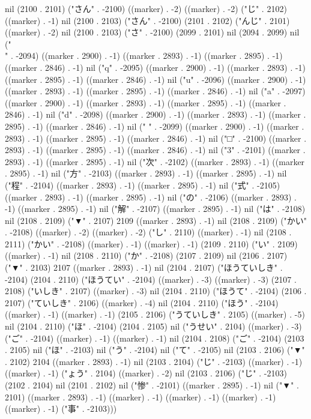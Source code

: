 nil (2100 . 2101) ("さん" . -2100) ((marker) . -2) ((marker) . -2) ("じ" . 2102) ((marker) . -1) nil (2100 . 2103) ("さん" . -2100) (2101 . 2102) ("んじ" . 2101) ((marker) . -2) nil (2100 . 2103) ("さ" . -2100) (2099 . 2101) nil (2094 . 2099) nil ("\\" . -2094) ((marker . 2900) . -1) ((marker . 2893) . -1) ((marker . 2895) . -1) ((marker . 2846) . -1) nil ("q" . -2095) ((marker . 2900) . -1) ((marker . 2893) . -1) ((marker . 2895) . -1) ((marker . 2846) . -1) nil ("u" . -2096) ((marker . 2900) . -1) ((marker . 2893) . -1) ((marker . 2895) . -1) ((marker . 2846) . -1) nil ("a" . -2097) ((marker . 2900) . -1) ((marker . 2893) . -1) ((marker . 2895) . -1) ((marker . 2846) . -1) nil ("d" . -2098) ((marker . 2900) . -1) ((marker . 2893) . -1) ((marker . 2895) . -1) ((marker . 2846) . -1) nil (" " . -2099) ((marker . 2900) . -1) ((marker . 2893) . -1) ((marker . 2895) . -1) ((marker . 2846) . -1) nil ("□" . -2100) ((marker . 2893) . -1) ((marker . 2895) . -1) ((marker . 2846) . -1) nil ("3" . -2101) ((marker . 2893) . -1) ((marker . 2895) . -1) nil ("次" . -2102) ((marker . 2893) . -1) ((marker . 2895) . -1) nil ("方" . -2103) ((marker . 2893) . -1) ((marker . 2895) . -1) nil ("程" . -2104) ((marker . 2893) . -1) ((marker . 2895) . -1) nil ("式" . -2105) ((marker . 2893) . -1) ((marker . 2895) . -1) nil ("の" . -2106) ((marker . 2893) . -1) ((marker . 2895) . -1) nil ("解" . -2107) ((marker . 2895) . -1) nil ("は" . -2108) nil (2108 . 2109) ("▼" . 2107) 2109 ((marker . 2893) . -1) nil (2108 . 2109) ("かい" . -2108) ((marker) . -2) ((marker) . -2) ("し" . 2110) ((marker) . -1) nil (2108 . 2111) ("かい" . -2108) ((marker) . -1) ((marker) . -1) (2109 . 2110) ("い" . 2109) ((marker) . -1) nil (2108 . 2110) ("か" . -2108) (2107 . 2109) nil (2106 . 2107) ("▼" . 2103) 2107 ((marker . 2893) . -1) nil (2104 . 2107) ("ほうていしき" . -2104) (2104 . 2110) ("ほうてい" . -2104) ((marker) . -3) ((marker) . -3) (2107 . 2108) ("いしき" . 2107) ((marker) . -3) nil (2104 . 2110) ("ほうて" . -2104) (2106 . 2107) ("ていしき" . 2106) ((marker) . -4) nil (2104 . 2110) ("ほう" . -2104) ((marker) . -1) ((marker) . -1) (2105 . 2106) ("うていしき" . 2105) ((marker) . -5) nil (2104 . 2110) ("ほ" . -2104) (2104 . 2105) nil ("うせい" . 2104) ((marker) . -3) ("ご" . -2104) ((marker) . -1) ((marker) . -1) nil (2104 . 2108) ("ご" . -2104) (2103 . 2105) nil ("ほ" . -2103) nil ("う" . -2104) nil ("て" . -2105) nil (2103 . 2106) ("▼" . 2102) 2104 ((marker . 2893) . -1) nil (2103 . 2104) ("じ" . -2103) ((marker) . -1) ((marker) . -1) ("ょう" . 2104) ((marker) . -2) nil (2103 . 2106) ("じ" . -2103) (2102 . 2104) nil (2101 . 2102) nil ("惨" . -2101) ((marker . 2895) . -1) nil ("▼" . 2101) ((marker . 2893) . -1) ((marker) . -1) ((marker) . -1) ((marker) . -1) ((marker) . -1) ("事" . -2103)))
